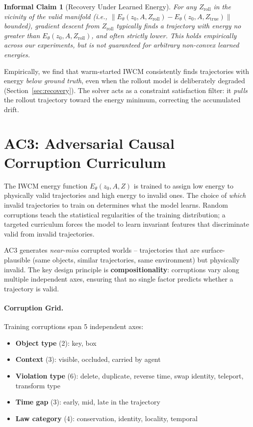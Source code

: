 \documentclass[12pt]{article}
\newtheorem{informalclaim}{Informal Claim}
\begin{document}
\begin{informalclaim}[Recovery Under Learned Energy]
\label{prop:recovery}
For any $Z_\text{roll}$ in the vicinity of the valid manifold (i.e., $\|E_\theta(z_0, A, Z_\text{roll}) - E_\theta(z_0, A, Z_\text{true})\|$ bounded), gradient descent from $Z_\text{roll}$ typically finds a trajectory with energy no greater than $E_\theta(z_0, A, Z_\text{roll})$, and often strictly lower. This holds empirically across our experiments, but is not guaranteed for arbitrary non-convex learned energies.
\end{informalclaim}

Empirically, we find that warm-started IWCM consistently finds trajectories with energy \emph{below ground truth}, even when the rollout model is deliberately degraded (Section~\ref{sec:recovery}). The solver acts as a constraint satisfaction filter: it \emph{pulls} the rollout trajectory toward the energy minimum, correcting the accumulated drift.

\section{AC3: Adversarial Causal Corruption Curriculum}
\label{sec:ac3}

The IWCM energy function $E_\theta(z_0, A, Z)$ is trained to assign low energy to physically valid trajectories and high energy to invalid ones. The choice of \emph{which} invalid trajectories to train on determines what the model learns. Random corruptions teach the statistical regularities of the training distribution; a targeted curriculum forces the model to learn invariant features that discriminate valid from invalid trajectories.

AC3 generates \emph{near-miss} corrupted worlds -- trajectories that are surface-plausible (same objects, similar trajectories, same environment) but physically invalid. The key design principle is \textbf{compositionality}: corruptions vary along multiple independent axes, ensuring that no single factor predicts whether a trajectory is valid.

\paragraph{Corruption Grid.} Training corruptions span 5 independent axes:

\begin{itemize}
  \item \textbf{Object type} (2): key, box
  \item \textbf{Context} (3): visible, occluded, carried by agent
  \item \textbf{Violation type} (6): delete, duplicate, reverse time, swap identity, teleport, transform type
  \item \textbf{Time gap} (3): early, mid, late in the trajectory
  \item \textbf{Law category} (4): conservation, identity, locality, temporal
\end{itemize}
\end{document}

